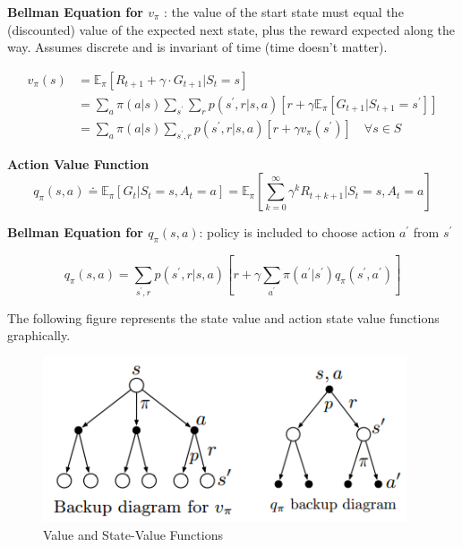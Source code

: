 \documentclass{article}
\begin{document}
\newpage
\noindent
\textbf{Bellman Equation for $v_{\pi}$}
: the value of the start state must equal the
(discounted) value of the expected next state, plus the reward expected along
the way. Assumes discrete and is invariant of time (time doesn't matter).

\begin{equation}
\begin{aligned}
v_{\pi}(s) &= \mathbb{E}_{\pi}[R_{t+1}+\gamma \cdot G_{t+1} | S_{t}=s] \\
&= \sum_{a} \pi(a | s) \sum_{s^{\prime}} \sum_{r} p(s^{\prime}, r|s, a)[r+\gamma \mathbb{E}_{\pi}[G_{t+1} | S_{t+1}=s^{\prime}]]\\
&=\sum_{a} \pi(a | s) \sum_{s^{\prime}, r} p\left(s^{\prime}, r | s, a\right)\left[r+\gamma v_{\pi}\left(s^{\prime}\right)\right] \quad \forall s \in S
\end{aligned}
\end{equation}

\noindent
\textbf{Action Value Function}
\begin{equation}
q_{\pi}(s, a) \doteq \mathbb{E}_{\pi}\left[G_{t} | S_{t}=s, A_{t}=a\right]=\mathbb{E}_{\pi}\left[\sum_{k=0}^{\infty} \gamma^{k} R_{t+k+1} | S_{t}=s, A_{t}=a\right]
\end{equation}

\noindent
\textbf{Bellman Equation for $q_{\pi}(s, a)$}: policy is included to choose
action $a^{\prime}$ from $s^{\prime}$

\begin{equation}
q_{\pi}(s, a)=\sum_{s^{\prime}, r} p\left(s^{\prime}, r | s, a\right)\left[r+\gamma \sum_{a^{\prime}} \pi\left(a^{\prime} | s^{\prime}\right) q_{\pi}\left(s^{\prime}, a^{\prime}\right)\right]
\end{equation}

\noindent
The following figure represents the state value and action state value functions
graphically.

\begin{figure}[h]
\includegraphics[scale=0.5]{value_functions}
\centering
\caption{Value and State-Value Functions}
\end{figure}
\end{document}
